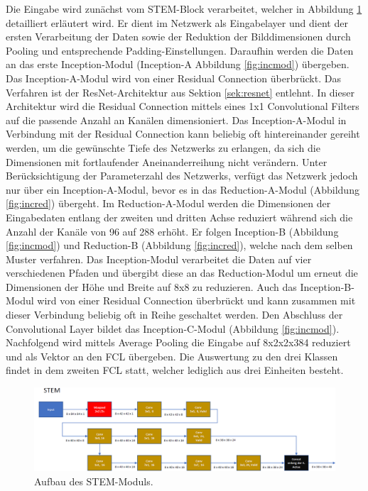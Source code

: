 Die Eingabe wird zunächst vom STEM-Block verarbeitet, welcher in Abbildung \ref{fig:stem} detailliert erläutert wird. Er dient im Netzwerk als Eingabelayer und dient der ersten Verarbeitung der Daten sowie der Reduktion der Bilddimensionen durch Pooling und entsprechende Padding-Einstellungen. Daraufhin werden die Daten an das erste Inception-Modul (Inception-A Abbildung \ref{fig:incmod}) übergeben. Das Inception-A-Modul wird von einer Residual Connection überbrückt. Das Verfahren ist der ResNet-Architektur aus Sektion \ref{sek:resnet} entlehnt. In dieser Architektur wird die Residual Connection mittels eines 1x1 Convolutional Filters auf die passende Anzahl an Kanälen dimensioniert. Das Inception-A-Modul in Verbindung mit der Residual Connection kann beliebig oft hintereinander gereiht werden, um die gewünschte Tiefe des Netzwerks zu erlangen, da sich die Dimensionen mit fortlaufender Aneinanderreihung nicht verändern. Unter Berücksichtigung der Parameterzahl des Netzwerks, verfügt das Netzwerk jedoch nur über ein Inception-A-Modul, bevor es in das Reduction-A-Modul (Abbildung \ref{fig:incred}) übergeht. Im Reduction-A-Modul werden die Dimensionen der Eingabedaten entlang der zweiten und dritten Achse reduziert während sich die Anzahl der Kanäle von 96 auf 288 erhöht. Er folgen Inception-B (Abbildung \ref{fig:incmod}) und Reduction-B (Abbildung \ref{fig:incred}), welche nach dem selben Muster verfahren. Das Inception-Modul verarbeitet die Daten auf vier verschiedenen Pfaden und übergibt diese an das Reduction-Modul um erneut die Dimensionen der Höhe und Breite auf 8x8 zu reduzieren. Auch das Inception-B-Modul wird von einer Residual Connection überbrückt und kann zusammen mit dieser Verbindung beliebig oft in Reihe geschaltet werden. Den Abschluss der Convolutional Layer bildet das Inception-C-Modul (Abbildung \ref{fig:incmod}). Nachfolgend wird mittels Average Pooling die Eingabe auf 8x2x2x384 reduziert und als Vektor an den FCL übergeben. Die Auswertung zu den drei Klassen findet in dem zweiten FCL statt, welcher lediglich aus drei Einheiten besteht. 
\newpage
\begin{figure}[H]
\centering
\thispagestyle{empty}
\includegraphics[angle=90, scale=0.65]{pictures/Inception/STEM}
\caption[Caption for LOF]{Aufbau des STEM-Moduls.}
\label{fig:stem}
\end{figure}

